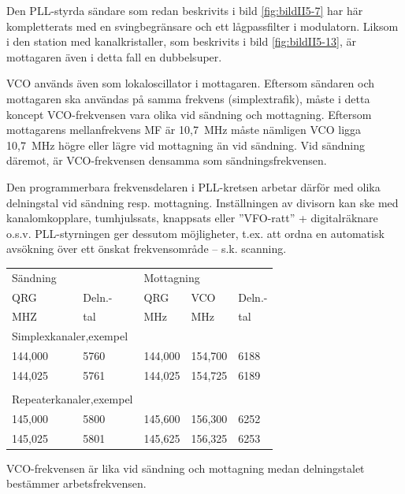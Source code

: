 Den PLL-styrda sändare som redan beskrivits i bild \ref{fig:bildII5-7} har här
kompletterats med en svingbegränsare och ett lågpassfilter i modulatorn.
Liksom i den station med kanalkristaller, som beskrivits i
bild \ref{fig:bildII5-13}, är mottagaren även i detta fall en dubbelsuper.

VCO används även som lokaloscillator i mottagaren.
Eftersom sändaren och mottagaren ska användas på samma frekvens
(simplextrafik), måste i detta koncept VCO-frekvensen vara olika vid
sändning och mottagning.
Eftersom mottagarens mellanfrekvens MF är 10,7~MHz måste nämligen VCO
ligga 10,7~MHz högre eller lägre vid mottagning än vid sändning.
Vid sändning däremot, är VCO-frekvensen densamma som sändningsfrekvensen.

Den programmerbara frekvensdelaren i PLL-kretsen arbetar därför med
olika delningstal vid sändning resp. mottagning.
Inställningen av divisorn kan ske med kanalomkopplare, tumhjulssats,
knappsats eller ''VFO-ratt'' + digitalräknare o.s.v.
PLL-styrningen ger dessutom möjligheter, t.ex. att ordna en automatisk
avsökning över ett önskat frekvensområde -- s.k. scanning.

\begin{table}[h]
\begin{center}
  \begin{tabular}{ll|lll}
    \multicolumn{2}{l|}{Sändning} &
    \multicolumn{3}{l}{Mottagning} \\
    QRG & Deln.- & QRG & VCO & Deln.- \\
    MHZ & tal    & MHz & MHz & tal \\
    \hline
    \multicolumn{2}{l|}{Simplexkanaler,exempel} & & & \\
    144,000 & 5760 & 144,000 & 154,700 & 6188 \\
    144,025 & 5761 & 144,025 & 154,725 & 6189 \\
    & & & & \\
    \multicolumn{2}{l|}{Repeaterkanaler,exempel} & & & \\
    145,000 & 5800 & 145,600 & 156,300 & 6252 \\
    145,025 & 5801 & 145,625 & 156,325 & 6253 \\
  \end{tabular}
\end{center}
\end{table}

VCO-frekvensen är lika vid sändning och mottagning medan delningstalet
bestämmer arbetsfrekvensen.

